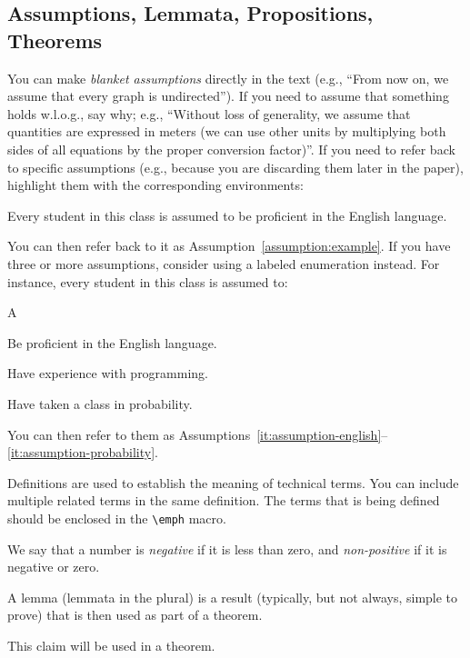 \documentclass[letterpaper, 10 pt, conference]{ieeeconf}
\begin{document}
\subsection{Assumptions, Lemmata, Propositions, Theorems}
You can make \emph{blanket assumptions} directly in the text (e.g., ``From now on, we assume that every graph is undirected''). If you need to assume that something holds w.l.o.g., say why; e.g., ``Without loss of generality, we assume that quantities are expressed in meters (we can use other units by multiplying both sides of all equations by the proper conversion factor)''.
If you need to refer back to specific assumptions (e.g., because you are discarding them later in the paper), highlight them with the corresponding environments:
\begin{assumption}\label{assumption:example}
  Every student in this class is assumed to be proficient in the English language.
\end{assumption}
You can then refer back to it as Assumption~\ref{assumption:example}.
If you have three or more assumptions, consider using a labeled enumeration instead. For instance, every student in this class is assumed to:

\begin{lenumerate}{A}
\item \label{it:assumption-english} Be proficient in the English language.
\item Have experience with programming.
\item \label{it:assumption-probability} Have taken a class in probability.
\end{lenumerate}
You can then refer to them as Assumptions~\ref{it:assumption-english}--\ref{it:assumption-probability}.

Definitions are used to establish the meaning of technical terms. You can include multiple related terms in the same definition. The terms that is being defined should be enclosed in the \verb|\emph| macro.
\begin{definition}
  We say that a number is \emph{negative} if it is less than zero, and \emph{non-positive} if it is negative or zero.
\end{definition}

A lemma (lemmata in the plural) is a result (typically, but not always, simple to prove) that is then used as part of a theorem.
\begin{lemma}
  This claim will be used in a theorem.
\end{lemma}
\end{document}
